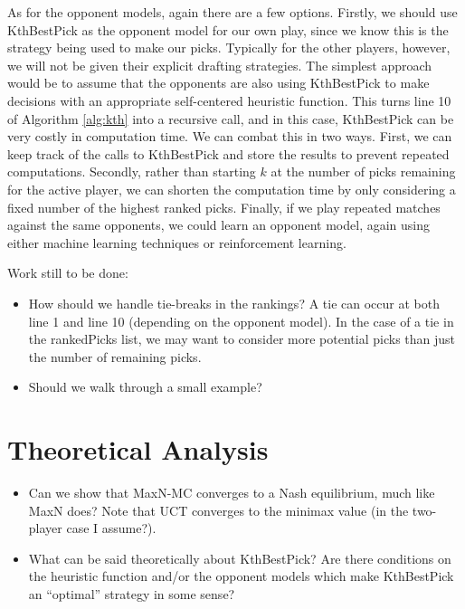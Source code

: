 \documentclass[letterpaper]{article}
\numberwithin{equation}{section}
\numberwithin{theorem}{section}
\numberwithin{lemma}{section}
\numberwithin{df}{section}
\begin{document}
As for the opponent models, again there are a few options.  Firstly, we should use KthBestPick as the opponent model for our own play, since we know this is the strategy being used to make our picks.  Typically for the other players, however, we will not be given their explicit drafting strategies.  The simplest approach would be to assume that the opponents are also using KthBestPick to make decisions with an appropriate self-centered heuristic function.  This turns line 10 of Algorithm \ref{alg:kth} into a recursive call, and in this case, KthBestPick can be very costly in computation time.  We can combat this in two ways.  First, we can keep track of the calls to KthBestPick and store the results to prevent repeated computations.  Secondly, rather than starting $k$ at the number of picks remaining for the active player, we can shorten the computation time by only considering a fixed number of the highest ranked picks.  Finally, if we play repeated matches against the same opponents, we could learn an opponent model, again using either machine learning techniques or reinforcement learning.

Work still to be done:
\begin{itemize}
	\item How should we handle tie-breaks in the rankings?  A tie can occur at both line 1 and line 10 (depending on the opponent model).  In the case of a tie in the rankedPicks list, we may want to consider more potential picks than just the number of remaining picks.
	\item Should we walk through a small example?
\end{itemize}

\section{Theoretical Analysis}

\begin{itemize}
	\item Can we show that MaxN-MC converges to a Nash equilibrium, much like MaxN does?  Note that UCT converges to the minimax value (in the two-player case I assume?).
	\item What can be said theoretically about KthBestPick?  Are there conditions on the heuristic function and/or the opponent models which make KthBestPick an ``optimal'' strategy in some sense?
\end{itemize}
\end{document}
